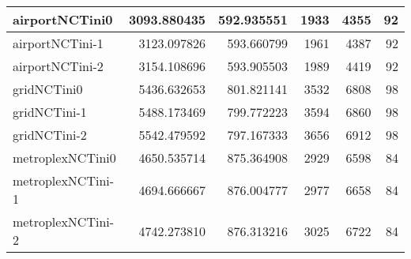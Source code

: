 \begin{longtable}{|l|r|r|r|r|r|}
airportNCTini0 & 3093.880435 & 592.935551 & 1933 & 4355 & 92 \\ \hline
airportNCTini-1 & 3123.097826 & 593.660799 & 1961 & 4387 & 92 \\ \hline
airportNCTini-2 & 3154.108696 & 593.905503 & 1989 & 4419 & 92 \\ \hline
gridNCTini0 & 5436.632653 & 801.821141 & 3532 & 6808 & 98 \\ \hline
gridNCTini-1 & 5488.173469 & 799.772223 & 3594 & 6860 & 98 \\ \hline
gridNCTini-2 & 5542.479592 & 797.167333 & 3656 & 6912 & 98 \\ \hline
metroplexNCTini0 & 4650.535714 & 875.364908 & 2929 & 6598 & 84 \\ \hline
metroplexNCTini-1 & 4694.666667 & 876.004777 & 2977 & 6658 & 84 \\ \hline
metroplexNCTini-2 & 4742.273810 & 876.313216 & 3025 & 6722 & 84 \\ \hline
\end{longtable}
